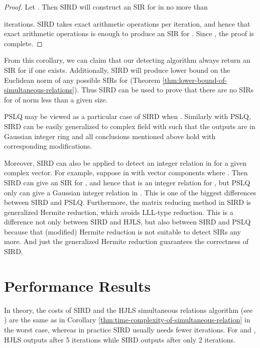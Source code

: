 \documentclass{sig-alternate}
\numberwithin{theorem}{section} \numberwithin{equation}{section}
\begin{document}
\begin{proof}
Let . Then SIRD will construct an SIR for   in no
more than

iterations. SIRD takes  exact arithmetic
operations per iteration, and hence that
 exact arithmetic
operations is enough to produce an SIR for . Since , the
proof is complete.
\end{proof}

\begin{rem}\label{rem:simultaneous-relation-algorithm}
From this corollary, we can claim that our detecting algorithm
always return an SIR for  if one exists. Additionally, SIRD will
produce lower bound on the Euclidean norm of any possible SIRs for
 (Theorem \ref{thm:lower-bound-of-simultaneous-relations}). Thus
SIRD can be used to prove that there are no SIRs for  of norm
less than a given size.
\end{rem}

\begin{rem}
PSLQ may be viewed as a particular case of SIRD when .
Similarly with PSLQ, SIRD can be easily generalized to complex field
with  such that the  outputs are in Gaussian
integer ring and all conclusions mentioned above hold with
corresponding modifications.
\end{rem}
\begin{rem}
Moreover, SIRD can also be applied to detect an integer relation in
 for a given complex vector. For example, suppose
 in  with
vector components  where . Then SIRD can give an SIR  for
, and hence that
 is an integer relation for ,
but PSLQ only can give a Gaussian integer relation in
. This is one of
the biggest differences between SIRD and PSLQ. Furthermore, the matrix reducing method in SIRD is generalized Hermite reduction,
which avoids LLL-type reduction. This is  a difference not only
between SIRD and HJLS, but also between SIRD and PSLQ because that
(modified) Hermite reduction is not suitable to detect SIRs any more. And just the generalized Hermite reduction guarantees
the correctness of SIRD.
\end{rem}





\section{Performance Results}\label{sec:Performance results}
In theory, the costs of SIRD and the HJLS simultaneous relations
algorithm (see \cite[section 5]{HJL1989}) are the same as in
Corollary \ref{thm:time-complexity-of-simultaneous-relation} in the
worst case, whereas in practice  SIRD usually needs fewer
iterations. For  and , HJLS outputs  after 5 iterations while
SIRD outputs  after only 2 iterations.
\end{document}
